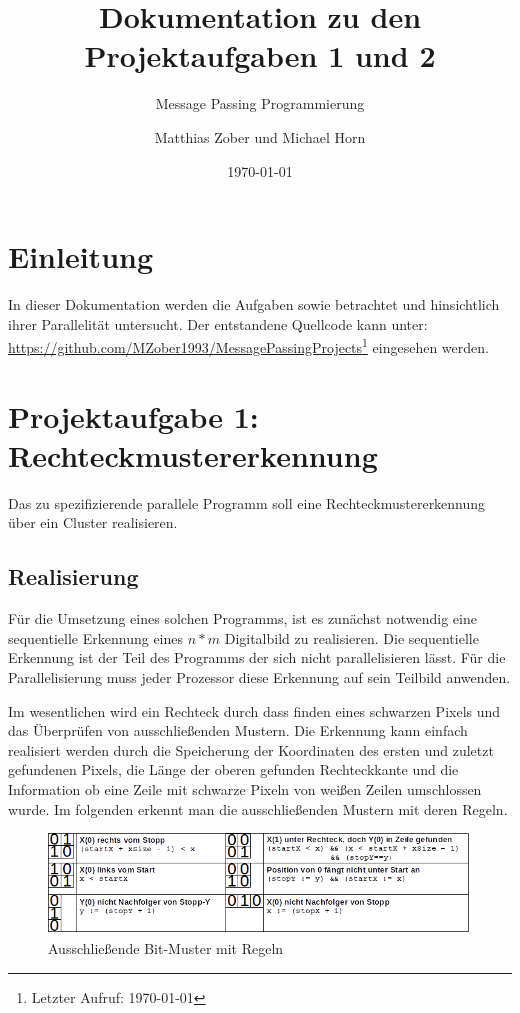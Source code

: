 	
					
\title{Dokumentation zu den Projektaufgaben 1 und 2}
\subtitle{Message Passing Programmierung}

\author{Matthias Zober und Michael Horn}
\date{\today}

\maketitle

\tableofcontents
\pagebreak

\section{Einleitung}
In dieser Dokumentation werden die Aufgaben  sowie  betrachtet und hinsichtlich ihrer Parallelität untersucht.
Der entstandene Quellcode kann unter:\\
\url{https://github.com/MZober1993/MessagePassingProjects}\footnote{Letzter Aufruf: \today}
eingesehen werden.
\section{Projektaufgabe 1: Rechteckmustererkennung}
Das zu spezifizierende parallele Programm soll eine Rechteckmustererkennung über ein Cluster realisieren.
\subsection{Realisierung}

Für die Umsetzung eines solchen Programms, ist es zunächst notwendig eine sequentielle Erkennung eines $n*m$ Digitalbild zu realisieren.
Die sequentielle Erkennung ist der Teil des Programms der sich nicht parallelisieren lässt. Für die Parallelisierung muss jeder Prozessor diese Erkennung auf sein Teilbild anwenden.

Im wesentlichen wird ein Rechteck durch dass finden eines schwarzen Pixels und das Überprüfen von ausschließenden Mustern. Die Erkennung kann einfach realisiert werden durch die Speicherung der Koordinaten des ersten und zuletzt gefundenen Pixels, die Länge der oberen gefunden Rechteckkante und die Information ob eine Zeile mit schwarze Pixeln von weißen Zeilen umschlossen wurde. Im folgenden erkennt man die ausschließenden Mustern mit deren Regeln.\newpage
\begin{figure}[]
    \centering
    \includegraphics[scale=0.8]{mismatches.png}
    \caption{Ausschließende Bit-Muster mit Regeln}
    \label{fig:mismatches}
\end{figure}

